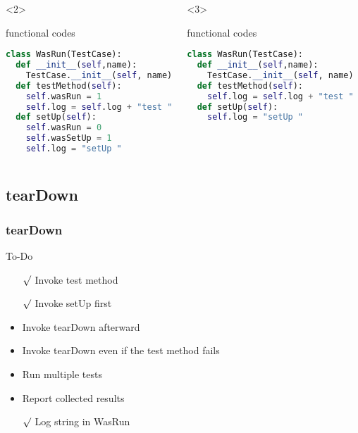 \documentclass[lualatex]{beamer}
\begin{document}
\begin{frame}[fragile,t]
\begin{columns}[t]
        \begin{onlyenv}<2>
            \begin{block}{functional codes}
                \begin{lstlisting}[language=Python,columns=fullflexible]
class WasRun(TestCase):
  def __init__(self,name):
    TestCase.__init__(self, name)
  def testMethod(self):
    self.wasRun = 1
    self.log = self.log + "test "
  def setUp(self):
    self.wasRun = 0
    self.wasSetUp = 1
    self.log = "setUp "
                \end{lstlisting}
            \end{block}
        \end{onlyenv}

        \begin{onlyenv}<3>
            \begin{block}{functional codes}
                \begin{lstlisting}[language=Python,columns=fullflexible]
class WasRun(TestCase):
  def __init__(self,name):
    TestCase.__init__(self, name)
  def testMethod(self):
    self.log = self.log + "test "
  def setUp(self):
    self.log = "setUp "
                \end{lstlisting}
            \end{block}
        \end{onlyenv}

    \end{columns}
\end{frame}

\subsection{tearDown}

\begin{frame}
    \frametitle{tearDown}

    \begin{block}{To-Do}
        \begin{itemize}
            \item[$\surd$] Invoke test method
            \item[$\surd$] Invoke setUp first 
            \item Invoke tearDown afterward 
            \item Invoke tearDown even if the test method fails 
            \item Run multiple tests 
            \item Report collected results 
            \item[$\surd$] Log string in WasRun 
        \end{itemize}
    \end{block}
\end{frame}
\end{document}
